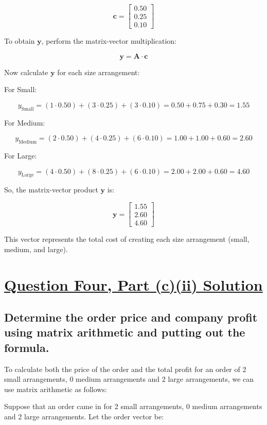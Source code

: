 \documentclass{article}
\begin{document}
\[
\mathbf{c} = \begin{bmatrix}
0.50 \\
0.25 \\
0.10
\end{bmatrix}
\]

To obtain $\mathbf{y}$, perform the matrix-vector multiplication:

\[
\mathbf{y} = \mathbf{A} \cdot \mathbf{c}
\]

Now calculate $\mathbf{y}$ for each size arrangement:

For Small:

\[
y_{\text{Small}} = (1 \cdot 0.50) + (3 \cdot 0.25) + (3 \cdot 0.10) = 0.50 + 0.75 + 0.30 = 1.55
\]

For Medium:

\[
y_{\text{Medium}} = (2 \cdot 0.50) + (4 \cdot 0.25) + (6 \cdot 0.10) = 1.00 + 1.00 + 0.60 = 2.60
\]

For Large:

\[
y_{\text{Large}} = (4 \cdot 0.50) + (8 \cdot 0.25) + (6 \cdot 0.10) = 2.00 + 2.00 + 0.60 = 4.60
\]

So, the matrix-vector product $\mathbf{y}$ is:

\[
\mathbf{y} = \begin{bmatrix}
1.55 \\
2.60 \\
4.60
\end{bmatrix}
\]

This vector represents the total cost of creating each size arrangement (small, medium, and large).

\section*{\uline{\large Question Four, Part (c)(ii) Solution}}

\subsection*{Determine the order price and company profit using matrix arithmetic and putting out the formula.}

To calculate both the price of the order and the total profit for an order of 2 small arrangements, 0 medium arrangements and 2 large arrangements, we can use matrix arithmetic as follows:

Suppose that an order came in for 2 small arrangements, 0 medium arrangements and 2 large arrangements. Let the order vector be:
\end{document}
